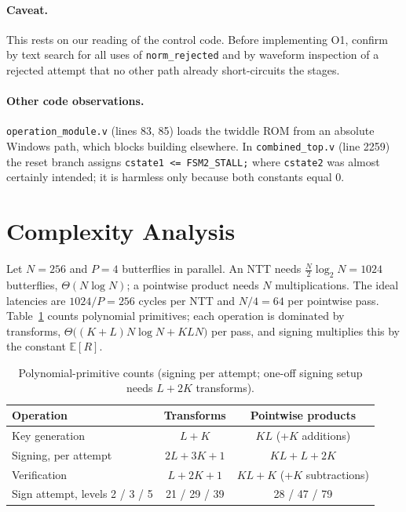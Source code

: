 \documentclass[12pt,a4paper]{report}
\newcommand{\code}[1]{\texttt{#1}}
\begin{document}
\paragraph{Caveat.}
This rests on our reading of the control code. Before implementing O1, confirm by text search for all uses of \code{norm\_rejected} and by waveform inspection of a rejected attempt that no other path already short-circuits the stages.

\paragraph{Other code observations.}
\code{operation\_module.v} (lines 83, 85) loads the twiddle ROM from an absolute Windows path, which blocks building elsewhere. In \code{combined\_top.v} (line 2259) the reset branch assigns \code{cstate1 <= FSM2\_STALL;} where \code{cstate2} was almost certainly intended; it is harmless only because both constants equal 0.

\section{Complexity Analysis}
Let $N=256$ and $P=4$ butterflies in parallel. An NTT needs $\tfrac N2\log_2N=1024$ butterflies, $\Theta(N\log N)$; a pointwise product needs $N$ multiplications. The ideal latencies are $1024/P=256$ cycles per NTT and $N/4=64$ per pointwise pass. Table~\ref{tab:opcount} counts polynomial primitives; each operation is dominated by transforms, $\Theta\big((K{+}L)N\log N+KLN\big)$ per pass, and signing multiplies this by the constant $\mathbb{E}[R]$.

\begin{table}[H]
\centering
\caption{Polynomial-primitive counts (signing per attempt; one-off signing setup needs $L+2K$ transforms).}\label{tab:opcount}
\begin{tabular}{@{}lcc@{}}
\toprule
Operation & Transforms & Pointwise products\\
\midrule
Key generation & $L+K$ & $KL$ (+$K$ additions)\\
Signing, per attempt & $2L+3K+1$ & $KL+L+2K$\\
Verification & $L+2K+1$ & $KL+K$ (+$K$ subtractions)\\
Sign attempt, levels 2 / 3 / 5 & 21 / 29 / 39 & 28 / 47 / 79\\
\bottomrule
\end{tabular}
\end{table}
\end{document}
